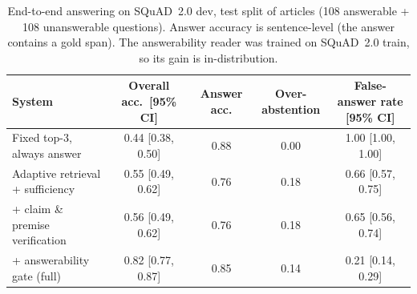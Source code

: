\begin{table}[t]
\centering\small
\begin{tabular}{lcccc}
\toprule
System & Overall acc.\ [95\% CI] & Answer acc. & Over-abstention & False-answer rate [95\% CI] \\
\midrule
Fixed top-3, always answer & 0.44 {\scriptsize[0.38, 0.50]} & 0.88 & 0.00 & 1.00 {\scriptsize[1.00, 1.00]} \\
Adaptive retrieval + sufficiency & 0.55 {\scriptsize[0.49, 0.62]} & 0.76 & 0.18 & 0.66 {\scriptsize[0.57, 0.75]} \\
\quad + claim \& premise verification & 0.56 {\scriptsize[0.49, 0.62]} & 0.76 & 0.18 & 0.65 {\scriptsize[0.56, 0.74]} \\
\quad + answerability gate (full) & 0.82 {\scriptsize[0.77, 0.87]} & 0.85 & 0.14 & 0.21 {\scriptsize[0.14, 0.29]} \\
\bottomrule
\end{tabular}
\caption{End-to-end answering on SQuAD~2.0 dev, test split of articles (108 answerable + 108 unanswerable questions).
Answer accuracy is sentence-level (the answer contains a gold span). The answerability reader was trained on SQuAD~2.0 train, so its gain is in-distribution.}
\label{tab:squad}
\end{table}
